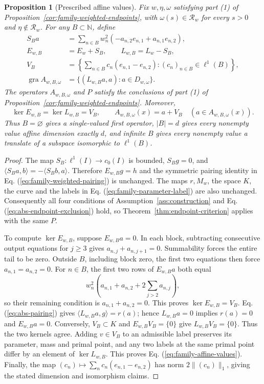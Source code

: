 \documentclass[11pt]{article}
\newcommand{\N}{\mathbb N}
\newcommand{\gra}{\operatorname{gra}}
\newcommand{\pair}[2]{\langle #1,#2\rangle}
\newtheorem{proposition}{Proposition}
\theoremstyle{definition}
\theoremstyle{remark}
\begin{document}
\begin{proposition}[Prescribed affine values]
\label{cor:family-affine-values}
Fix $w,\eta,\omega$ satisfying part (1) of Proposition~\ref{cor:family-weighted-endpoints}, with $\omega(s)\in\mathcal R_w$ for every $s>0$ and $\eta\notin\mathcal R_w$. For any $B\subset\N$, define
\begin{equation}
\begin{aligned}
S_Ba&=\sum_{n\in B}w_n^2(-a_{n,2}e_{n,1}+a_{n,1}e_{n,2}),\\
E_{w,B}&=E_w+S_B,\qquad L_{w,B}=L_w-S_B,\\
V_B&=\left\{\sum_{n\in B}c_n(e_{n,1}-e_{n,2}):(c_n)_{n\in B}\in\ell^1(B)\right\},\\
\gra A_{w,B,\omega}&=\{(L_{w,B}a,a):a\in D_{w,\omega}\}.
\end{aligned}
\label{eq:family-skew-maps}
\end{equation}
The operators $A_{w,B,\omega}$ and $P$ satisfy the conclusions of part (1) of Proposition~\ref{cor:family-weighted-endpoints}. Moreover,
\begin{equation}
\ker E_{w,B}=\ker L_{w,B}=V_B,\qquad
A_{w,B,\omega}(x)=a+V_B\quad(a\in A_{w,B,\omega}(x)).
\label{eq:family-affine-values}
\end{equation}
Thus $B=\varnothing$ gives a single-valued first operator, $|B|=d$ gives every nonempty value affine dimension exactly $d$, and infinite $B$ gives every nonempty value a translate of a subspace isomorphic to $\ell^1(B)$.
\end{proposition}
\begin{proof}
The map $S_B:\ell^1(I)\to c_0(I)$ is bounded, $S_Bg=0$, and $\pair{S_Ba}{b}=-\pair{S_Bb}{a}$. Therefore $E_{w,B}g=h$ and the symmetric pairing identity in Eq. (\ref{eq:family-weighted-pairing}) is unchanged. The maps $r,M_w$, the space $K$, the curve and the labels in Eq. (\ref{eq:family-parameter-label}) are also unchanged. Consequently all four conditions of Assumption~\ref{ass:construction} and Eq. (\ref{eq:abs-endpoint-exclusion}) hold, so Theorem~\ref{thm:endpoint-criterion} applies with the same $P$.

To compute $\ker E_{w,B}$, suppose $E_{w,B}a=0$. In each block, subtracting consecutive output equations for $j\ge3$ gives $a_{n,j}+a_{n,j+1}=0$. Summability forces the entire tail to be zero. Outside $B$, including block zero, the first two equations then force $a_{n,1}=a_{n,2}=0$. For $n\in B$, the first two rows of $E_{w,B}a$ both equal
\[
w_n^2\left(a_{n,1}+a_{n,2}+2\sum_{j>2}a_{n,j}\right),
\]
so their remaining condition is $a_{n,1}+a_{n,2}=0$. This proves $\ker E_{w,B}=V_B$. Eq. (\ref{eq:abs-pairing}) gives $\pair{L_{w,B}a}{g}=r(a)$; hence $L_{w,B}a=0$ implies $r(a)=0$ and $E_{w,B}a=0$. Conversely, $V_B\subset K$ and $E_{w,B}V_B=\{0\}$ give $L_{w,B}V_B=\{0\}$. Thus the two kernels agree. Adding $v\in V_B$ to an admissible label preserves its parameter, mass and primal point, and any two labels at the same primal point differ by an element of $\ker L_{w,B}$. This proves Eq. (\ref{eq:family-affine-values}). Finally, the map $(c_n)\mapsto\sum_nc_n(e_{n,1}-e_{n,2})$ has norm $2\|(c_n)\|_1$, giving the stated dimension and isomorphism claims.
\end{proof}
\end{document}
